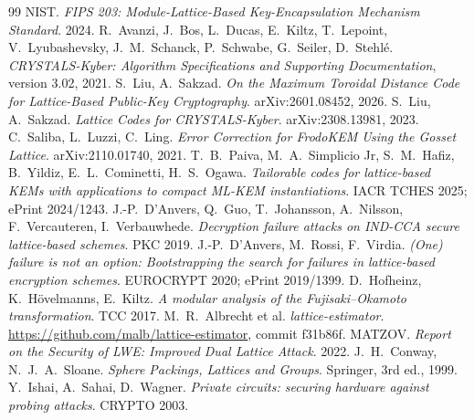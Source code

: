 \documentclass[11pt,a4paper]{article}
\theoremstyle{definition}
\theoremstyle{remark}
\begin{document}
\begin{thebibliography}{99}\small
{} NIST. \emph{FIPS 203: Module-Lattice-Based Key-Encapsulation Mechanism Standard}. 2024.
 R.~Avanzi, J.~Bos, L.~Ducas, E.~Kiltz, T.~Lepoint, V.~Lyubashevsky, J.~M.~Schanck, P.~Schwabe, G.~Seiler, D.~Stehl\'e. \emph{CRYSTALS-Kyber: Algorithm Specifications and Supporting Documentation}, version 3.02, 2021.
 S.~Liu, A.~Sakzad. \emph{On the Maximum Toroidal Distance Code for Lattice-Based Public-Key Cryptography}. arXiv:2601.08452, 2026.
 S.~Liu, A.~Sakzad. \emph{Lattice Codes for CRYSTALS-Kyber}. arXiv:2308.13981, 2023.
 C.~Saliba, L.~Luzzi, C.~Ling. \emph{Error Correction for FrodoKEM Using the Gosset Lattice}. arXiv:2110.01740, 2021.
 T.~B.~Paiva, M.~A.~Simplicio Jr, S.~M.~Hafiz, B.~Yildiz, E.~L.~Cominetti, H.~S.~Ogawa. \emph{Tailorable codes for lattice-based KEMs with applications to compact ML-KEM instantiations}. IACR TCHES 2025; ePrint 2024/1243.
 J.-P.~D'Anvers, Q.~Guo, T.~Johansson, A.~Nilsson, F.~Vercauteren, I.~Verbauwhede. \emph{Decryption failure attacks on IND-CCA secure lattice-based schemes}. PKC 2019.
 J.-P.~D'Anvers, M.~Rossi, F.~Virdia. \emph{(One) failure is not an option: Bootstrapping the search for failures in lattice-based encryption schemes}. EUROCRYPT 2020; ePrint 2019/1399.
 D.~Hofheinz, K.~H\"ovelmanns, E.~Kiltz. \emph{A modular analysis of the Fujisaki--Okamoto transformation}. TCC 2017.
 M.~R.~Albrecht et al. \emph{lattice-estimator}. \url{https://github.com/malb/lattice-estimator}, commit f31b86f.
 MATZOV. \emph{Report on the Security of LWE: Improved Dual Lattice Attack}. 2022.
 J.~H.~Conway, N.~J.~A.~Sloane. \emph{Sphere Packings, Lattices and Groups}. Springer, 3rd ed., 1999.
 Y.~Ishai, A.~Sahai, D.~Wagner. \emph{Private circuits: securing hardware against probing attacks}. CRYPTO 2003.
\end{thebibliography}
\end{document}
